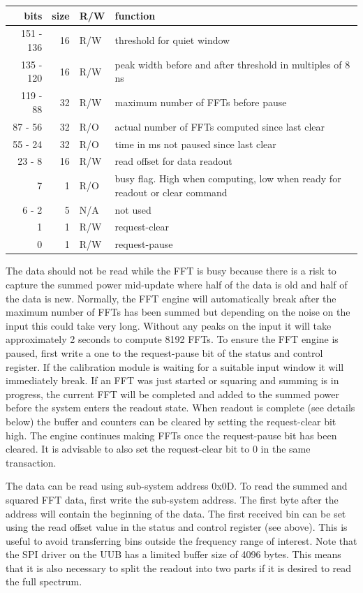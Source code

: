 \documentclass[a4paper,indent]{paper}
\begin{document}
\begin{tabular}{|r|r|l|l|}
  \hline
  bits & size & R/W & function \\
  \hline
  151 - 136 & 16 & R/W & threshold for quiet window \\
  135 - 120 & 16 & R/W & peak width before and after threshold in multiples of 8 ns \\
  119 -  88 & 32 & R/W & maximum number of \acp{FFT} before pause\\
   87 -  56 & 32 & R/O & actual number of \acp{FFT} computed since last clear\\
   55 -  24 & 32 & R/O & time in ms not paused since last clear\\
   23 -   8 & 16 & R/W & read offset for data readout\\
          7 &  1 & R/O & busy flag. High when computing, low when ready for readout or clear command\\
    6 -   2 &  5 & N/A & not used\\
          1 &  1 & R/W & request-clear\\
          0 &  1 & R/W & request-pause\\
  \hline
\end{tabular}

The data should not be read while the \acs{FFT} is busy because there is a risk to capture the summed power mid-update where half of the data is old and half of the data is new. Normally, the \acs{FFT} engine will automatically break after the maximum number of \acp{FFT} has been summed but depending on the noise on the input this could take very long. Without any peaks on the input it will take approximately 2 seconds to compute 8192 \acp{FFT}. To ensure the \acs{FFT} engine is paused, first write a one to the request-pause bit of the status and control register. If the calibration module is waiting for a suitable input window it will immediately break. If an \acs{FFT} was just started or squaring and summing is in progress, the current \acs{FFT} will be completed and added to the summed power before the system enters the readout state. When readout is complete (see details below) the buffer and counters can be cleared by setting the request-clear bit high. The engine continues making \acp{FFT} once the request-pause bit has been cleared. It is advisable to also set the request-clear bit to 0 in the same transaction.

The data can be read using sub-system address 0x0D. To read the summed and squared \acs{FFT} data, first write the sub-system address. The first byte after the address will contain the beginning of the data. The first received bin can be set using the read offset value in the status and control register (see above). This is useful to avoid transferring bins outside the frequency range of interest. Note that the \acs{SPI} driver on the \acs{UUB} has a limited buffer size of 4096 bytes. This means that it is also necessary to split the readout into two parts if it is desired to read the full spectrum.
\end{document}
